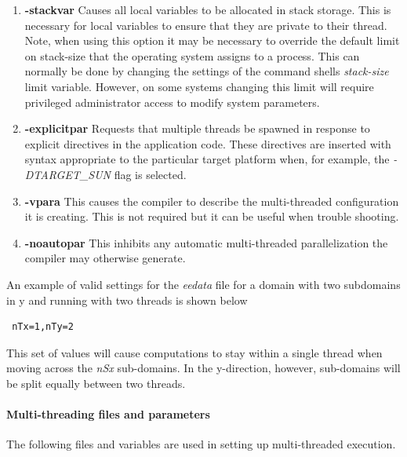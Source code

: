 \begin{enumerate}
\item {\bf -stackvar} Causes all local variables to be allocated in stack 
storage. This is necessary for local variables to ensure that they are private 
to their thread. Note, when using this option it may be necessary to override 
the default limit on stack-size that the operating system assigns to a process. 
This can normally be done by changing the settings of the command shells
{\em stack-size} limit variable. However, on some systems changing this limit
will require privileged administrator access to modify system parameters.

\item {\bf -explicitpar} Requests that multiple threads be spawned
in response to explicit directives in the application code. These
directives are inserted with syntax appropriate to the particular target
platform when, for example, the {\em -DTARGET\_SUN} flag is selected.

\item {\bf -vpara} This causes the compiler to describe the multi-threaded
configuration it is creating. This is not required
but it can be useful when trouble shooting.

\item {\bf -noautopar} This inhibits any automatic multi-threaded 
parallelization the compiler may otherwise generate.

\end{enumerate}


An example of valid settings for the {\em eedata} file for a
domain with two subdomains in y and running with two threads is shown 
below
\begin{verbatim}
 nTx=1,nTy=2
\end{verbatim}
This set of values will cause computations to stay within a single
thread when moving across the {\em nSx} sub-domains. In the y-direction,
however, sub-domains will be split equally between two threads.

\paragraph{Multi-threading files and parameters} The following
files and variables are used in setting up multi-threaded execution.\\

